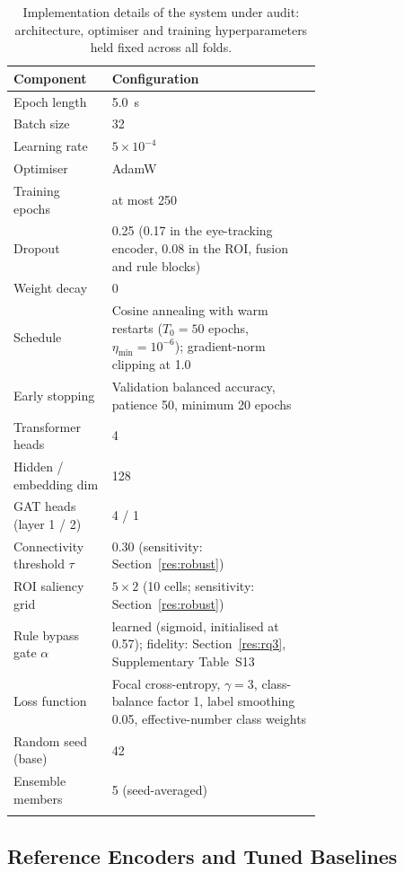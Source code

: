 \documentclass[pdflatex,sn-basic,Numbered,twocolumn,iicol]{sn-jnl}
\theoremstyle{thmstyleone}%
\theoremstyle{thmstyletwo}%
\theoremstyle{thmstylethree}%
\begin{document}
\begin{table}[!htbp]
\caption{Implementation details of the system under audit: architecture, optimiser and training hyperparameters held fixed across all folds.}\label{tab2}
\small
\begin{tabular*}{\linewidth}{@{\extracolsep{\fill}}lp{0.68\linewidth}@{}}
\toprule
Component & Configuration \\
\midrule
Epoch length & 5.0~s \\
Batch size & 32 \\
Learning rate & $5\times10^{-4}$ \\
Optimiser & AdamW \\
Training epochs & at most 250 \\
Dropout & 0.25 (0.17 in the eye-tracking encoder, 0.08 in the ROI, fusion and rule blocks) \\
Weight decay & 0 \\
Schedule & Cosine annealing with warm restarts ($T_0=50$ epochs, $\eta_{\min}=10^{-6}$); gradient-norm clipping at 1.0 \\
Early stopping & Validation balanced accuracy, patience 50, minimum 20 epochs \\
Transformer heads & 4 \\
Hidden / embedding dim & 128 \\
GAT heads (layer 1 / 2) & 4 / 1 \\
Connectivity threshold $\tau$ & 0.30 (sensitivity: Section~\ref{res:robust}) \\
ROI saliency grid & $5\times2$ (10 cells; sensitivity: Section~\ref{res:robust}) \\
Rule bypass gate $\alpha$ & learned (sigmoid, initialised at 0.57); fidelity: Section~\ref{res:rq3}, Supplementary Table~S13 \\
Loss function & Focal cross-entropy, $\gamma=3$, class-balance factor 1, label smoothing 0.05, effective-number class weights \cite{ref49} \\
Random seed (base) & 42 \\
Ensemble members & 5 (seed-averaged) \\
\botrule
\end{tabular*}
\end{table}

\subsection{Reference Encoders and Tuned Baselines}\label{sec:references}
\end{document}
